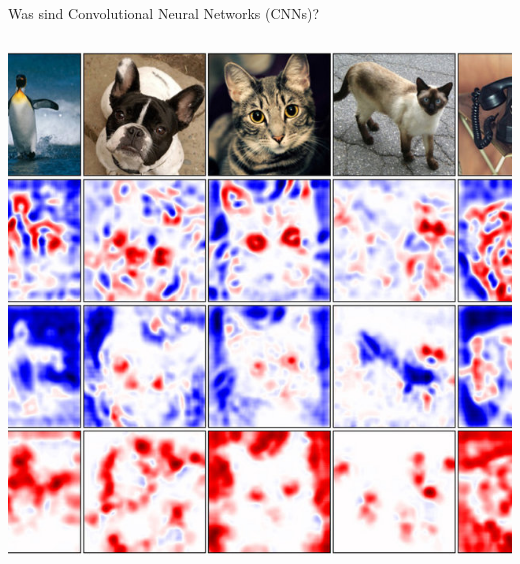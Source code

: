\documentclass[aspectratio=1610, xcolor=dvipsnames, 9pt]{beamer}
\begin{document}
\begin{frame}{Was sind Convolutional Neural Networks (CNNs)?}
\begin{columns}
\begin{column}{0.35\textwidth}
            \vspace{0.5cm}
            \includegraphics[width=\textwidth]{images/featuremaps.jpg}
          \end{column}
        \end{columns}
      \end{frame}
\end{document}
